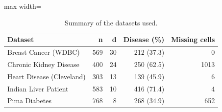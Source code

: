 \begin{table}[!t]
\centering
\caption{Summary of the datasets used.}
\label{tab:datasets}
\footnotesize
\setlength{\tabcolsep}{4pt}
\begin{adjustbox}{max width=\linewidth}
\begin{tabular}{lrrrr}
\toprule
\textbf{Dataset} & \textbf{n} & \textbf{d} & \textbf{Disease (\%)} & \textbf{Missing cells} \\
\midrule
Breast Cancer (WDBC) & 569 & 30 & 212 (37.3) & 0 \\
Chronic Kidney Disease & 400 & 24 & 250 (62.5) & 1013 \\
Heart Disease (Cleveland) & 303 & 13 & 139 (45.9) & 6 \\
Indian Liver Patient & 583 & 10 & 416 (71.4) & 4 \\
Pima Diabetes & 768 & 8 & 268 (34.9) & 652 \\
\bottomrule
\end{tabular}
\end{adjustbox}
\end{table}
